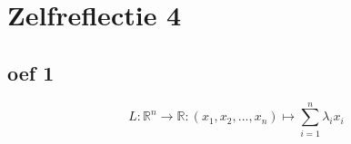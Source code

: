 \documentclass[lineaire_algebra_oplossingen.tex]{subfiles}
\begin{document}
\section{Zelfreflectie 4}

\subsection{oef 1}
\[
L: \mathbb{R}^n \rightarrow \mathbb{R}: (x_1,x_2,...,x_n) \mapsto \sum_{i=1}^n\lambda_ix_i
\]
\end{document}
